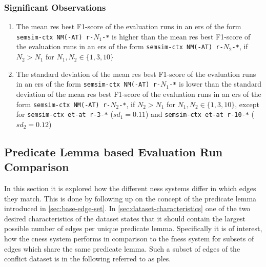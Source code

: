 \documentclass[11pt]{scrreprt}
\newcounter{listcounter}
\begin{document}
{\subsubsection{Significant Observations}
\begin{enumerate}[label=\arabic{listcounter}.\arabic*]
	\item The mean \gls{res} best F1-score of the evaluation runs in an \gls{ers} of the form \texttt{semsim-ctx NM(-AT) r-\(N_1\)-*} is higher than the mean \gls{res} best F1-score of the evaluation runs in an \gls{ers} of the form \texttt{semsim-ctx NM(-AT) r-\(N_2\)-*}, if \(N_2 > N_1\) for \(N_1, N_2 \in \{1, 3, 10\}\) \label{obs-itm:cness-more-refs-higher-mean-best-f1}
	\item The standard deviation of the mean \gls{res} best F1-score of the evaluation runs in an \gls{ers} of the form \texttt{semsim-ctx NM(-AT) r-\(N_1\)-*} is lower than the standard deviation of the mean \gls{res} best F1-score of the evaluation runs in an \gls{ers} of the form \texttt{semsim-ctx NM(-AT) r-\(N_2\)-*}, if \(N_2 > N_1\) for \(N_1, N_2 \in \{1, 3, 10\}\), except for \texttt{semsim-ctx et-at r-3-*} (\(sd_1 = 0.11\)) and \texttt{semsim-ctx et-at r-10-*} (\(sd_2 = 0.12\)) \label{obs-itm:cness-more-refs-lower-stddev-best-f1}
\end{enumerate}



\subsection{Predicate Lemma based Evaluation Run Comparison}
In this section it is explored how the different \gls{ness} systems differ in which edges they match. This is done by following up on the concept of the predicate lemma introduced in \cref{sec:base-edge-set}. In \cref{sec:dataset-characteristics} one of the two desired characteristics of the dataset states that it should contain the largest possible number of edges per unique predicate lemma. Specifically it is of interest, how the \gls{cness} system performs in comparison to the \gls{fness} system for subsets of edges which share the same predicate lemma. Such a subset of edges of the conflict dataset is in the following referred to as \gls{ples}.


}
\end{document}

